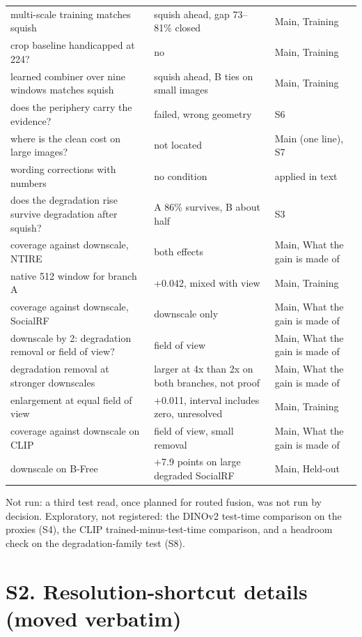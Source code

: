 \documentclass[10pt]{article}
\begin{document}
\begin{center}
\begin{tabular}{p{6.0cm}p{4.6cm}p{3.4cm}}
multi-scale training matches squish & squish ahead, gap 73--81\% closed & Main, Training \\
crop baseline handicapped at 224? & no & Main, Training \\
learned combiner over nine windows matches squish & squish ahead, B ties on small images & Main, Training \\
does the periphery carry the evidence? & failed, wrong geometry & S6 \\
where is the clean cost on large images? & not located & Main (one line), S7 \\
wording corrections with numbers & no condition & applied in text \\
does the degradation rise survive degradation after squish? & A 86\% survives, B about half & S3 \\
coverage against downscale, NTIRE & both effects & Main, What the gain is made of \\
native 512 window for branch A & +0.042, mixed with view & Main, Training \\
coverage against downscale, SocialRF & downscale only & Main, What the gain is made of \\
downscale by 2: degradation removal or field of view? & field of view & Main, What the gain is made of \\
degradation removal at stronger downscales & larger at 4x than 2x on both branches, not proof & Main, What the gain is made of \\
enlargement at equal field of view & +0.011, interval includes zero, unresolved & Main, Training \\
coverage against downscale on CLIP & field of view, small removal & Main, What the gain is made of \\
downscale on B-Free & +7.9 points on large degraded SocialRF & Main, Held-out \\
\bottomrule
\end{tabular}
\end{center}

Not run: a third test read, once planned for routed fusion, was not run by decision.
Exploratory, not registered: the DINOv2 test-time comparison on the proxies
(S4), the CLIP trained-minus-test-time comparison, and a headroom check on
the degradation-family test (S8).

\section*{S2. Resolution-shortcut details (moved verbatim)}
\end{document}
